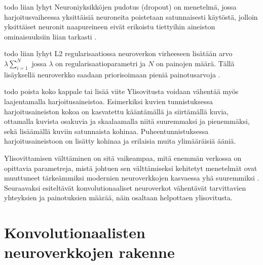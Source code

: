 \documentclass[finnish]{tktltiki2}
\theoremstyle{definition}
\theoremstyle{remark}
\begin{document}
  todo liian lyhyt
  Neuroniyksikköjen pudotus (dropout) on menetelmä, jossa harjoitusvaiheessa yksittäisiä neuroneita poistetaan satunnaisesti käytöstä, jolloin yksittäiset neuronit naapureineen eivät erikoistu tiettyihin aineiston ominaisuuksiin liian tarkasti \cite{dropout-srivastava}.

  todo liian lyhyt
  L2 regularisaatiossa neuroverkon virheeseen lisätään arvo $\lambda \sum_{i=1}^N$ jossa $\lambda$ on regularisaatioparametri ja $N$ on painojen määrä. Tällä lisäyksellä neuroverkko saadaan priorisoimaan pieniä painotusarvoja \cite{ng2004feature}.
  
  todo poista koko kappale tai lisää viite
  Ylisovitusta voidaan vähentää myös laajentamalla harjoitusaineistoa. Esimerkiksi kuvien tunnistuksessa harjoitusaineiston kokoa on kasvatettu kääntämällä ja siirtämällä kuvia, ottamalla kuvista osakuvia ja skaalaamalla niitä suuremmaksi ja pienemmäksi, sekä lisäämällä kuviin satunnaista kohinaa. Puheentunnistuksessa harjoitusaineistoon on lisätty kohinaa ja erilaisia muita ylimääräisiä ääniä.

 Ylisovittamisen välttäminen on sitä vaikeampaa, mitä enemmän verkossa on opittavia parametreja, mistä johtuen sen välttämiseksi kehitetyt menetelmät ovat muuttuneet tärkeämmiksi modernien neuroverkkojen kasvaessa yhä suuremmiksi \cite{SzegedyLJSRAEVR14}. Seuraavaksi esiteltävät konvolutionaaliset neuroverkot vähentävät tarvittavien yhteyksien ja painotuksien määrää, näin osaltaan helpottaen ylisovitusta.

  
  \section{Konvolutionaalisten neuroverkkojen rakenne}

\end{document}
